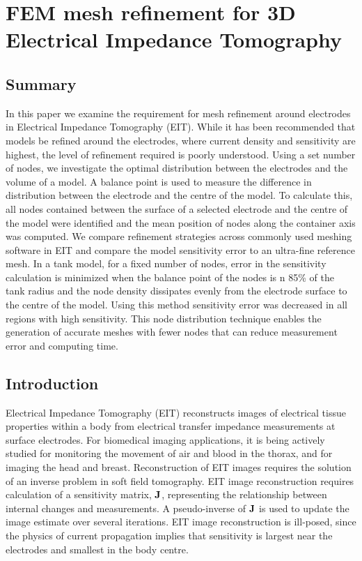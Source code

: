 \chapter{FEM mesh refinement for 3D Electrical Impedance Tomography}
\label{chap:chapter-4}

\section{Summary}
In this paper we examine the requirement for mesh refinement around 
electrodes in Electrical Impedance Tomography (EIT). 
While it has been recommended that  models be refined around the electrodes, where current
density and sensitivity are highest,  the level of refinement required is poorly understood. 
Using a set number of nodes, we investigate the optimal distribution 
between the electrodes and 
the volume of a model. 
A balance point is used to measure the difference in distribution between the electrode and the centre of
the model.
To calculate this, all nodes contained between the surface of a selected electrode and the centre of the model 
were identified and the mean position of nodes along the container axis was computed. 
We compare refinement strategies across commonly used meshing software in EIT and compare the 
model sensitivity error to an ultra-fine reference mesh. 
In a tank model, for a fixed number of nodes, error in the sensitivity calculation is minimized 
when the balance point of the nodes is n  85\% of the tank radius and the node density dissipates evenly 
from the electrode surface to the centre of the model. Using this method sensitivity error was decreased 
in all regions with high sensitivity. This node distribution technique  enables the generation  of accurate 
meshes with fewer nodes that can reduce measurement error and computing time. 

\section{Introduction}
Electrical Impedance Tomography (EIT) reconstructs images of 
electrical tissue properties within a body from electrical
transfer impedance measurements at surface electrodes. For
biomedical imaging applications, it is being actively studied
for monitoring
the movement of air and blood in the thorax, and for imaging
the head and breast. Reconstruction of EIT images requires
the solution of an inverse problem in soft field tomography.
EIT image reconstruction requires 
calculation of a sensitivity matrix, $\bf J$, representing the relationship between internal 
changes and measurements. A pseudo-inverse of $\bf J$ is used
to update the image estimate over several iterations. 
EIT image reconstruction is ill-posed, since the physics of
current propagation implies that sensitivity is largest near
the electrodes and smallest in the body centre.

